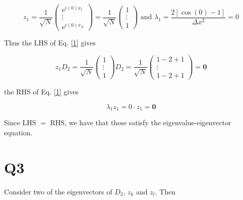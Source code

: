 \documentclass{article}
\newcommand{\E}{\mathrm{e}}
\begin{document}
\[
	z_1 
	= \frac{ 1 }{ \sqrt{N} } 
	\begin{pmatrix}
	\E^{i (0) x_1} \\
	\vdots \\
	\E^{i (0) x_N}
	\end{pmatrix}
	= \frac{ 1 }{ \sqrt{N} } 
	\begin{pmatrix}
	1 \\
	\vdots \\
	1
	\end{pmatrix}
	\text{ and }
	\lambda_1 = \frac{2 [ \cos( 0 ) - 1 ]}{\Delta x^2} = 0
\]

Thus the LHS of Eq. \eqref{1} gives

\[
	z_1 D_2 = \frac{ 1 }{ \sqrt{N} } 
	\begin{pmatrix}
	1 \\
	\vdots \\
	1
	\end{pmatrix}
	D_2 = \frac{ 1 }{ \sqrt{N} } 
	\begin{pmatrix}
	1-2+1 \\
	\vdots \\
	1-2+1
	\end{pmatrix} = \textbf{0}
\]

the RHS of Eq. \eqref{1} gives

\[
	\lambda_1 z_1 = 0 \cdot z_1 = \textbf{0}
\]

Since LHS $=$ RHS, we have that these satisfy the eigenvalue-eigenvector equation.

\newpage
\section{Q3}

Consider two of the eigenvectors of $D_2$, $z_k$ and $z_l$. Then
\end{document}
